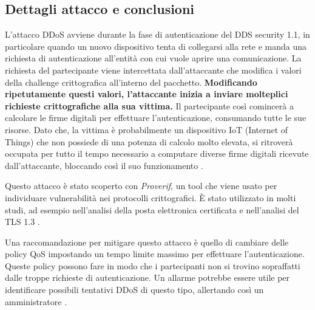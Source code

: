 \subsection{Dettagli attacco e conclusioni}
L'attacco DDoS avviene durante la fase di autenticazione del
DDS security 1.1, in particolare quando un nuovo dispositivo tenta di
collegarsi alla rete e manda una richiesta di autenticazione
all'entità con cui vuole aprire una comunicazione. 
La richiesta del partecipante viene intercettata
dall'attaccante che modifica i valori della challenge crittografica 
all'interno del pacchetto. 
\textbf{Modificando ripetutamente questi valori, l'attaccante
inizia a inviare molteplici richieste crittografiche alla sua vittima.}
Il partecipante così comincerà a calcolare le firme digitali per effettuare
l'autenticazione, consumando tutte le sue risorse.
Dato che, la vittima è probabilmente un dispositivo IoT
(Internet of Things)
che non possiede di una potenza di calcolo molto elevata, si ritroverà
occupata per tutto il tempo necessario a computare diverse firme digitali
ricevute dall'attaccante, bloccando così il suo funzionamento
\cite{DBLP:conf/asiaccs/WangLG24}.


Questo attacco è stato scoperto con \textit{Proverif}, 
un tool che viene usato
per individuare vulnerabilità nei protocolli crittografici. 
È stato utilizzato in molti studi, ad esempio nell'analisi della 
posta elettronica certificata e nell'analisi del TLS 1.3 \cite{proverifmanual}.

Una raccomandazione per mitigare questo attacco è quello di 
cambiare delle
policy QoS impostando un tempo limite massimo per effettuare
l'autenticazione. Queste policy possono fare in modo
che i partecipanti non si trovino sopraffatti dalle 
troppe richieste di
autenticazione. Un allarme potrebbe essere utile per 
identificare possibili
tentativi DDoS di questo tipo, 
allertando così un amministratore
\cite{DBLP:conf/asiaccs/WangLG24}.






%     






